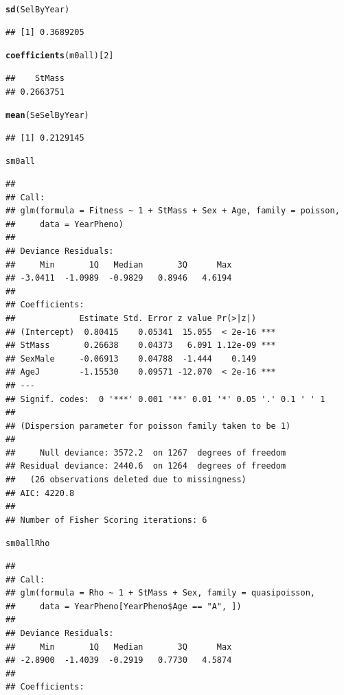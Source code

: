 \documentclass{article}\usepackage[]{graphicx}\usepackage[]{color}
\makeatletter
\newcommand{\hlnum}[1]{\textcolor[rgb]{0.686,0.059,0.569}{#1}}%
\newcommand{\hlstd}[1]{\textcolor[rgb]{0.345,0.345,0.345}{#1}}%
\newcommand{\hlkwd}[1]{\textcolor[rgb]{0.737,0.353,0.396}{\textbf{#1}}}%
\newenvironment{kframe}{%
 \def\at@end@of@kframe{}%
 \ifinner\ifhmode%
  \def\at@end@of@kframe{\end{minipage}}%
  \begin{minipage}{\columnwidth}%
 \fi\fi%
 \def\FrameCommand##1{\hskip\@totalleftmargin \hskip-\fboxsep
 \colorbox{shadecolor}{##1}\hskip-\fboxsep
     \hskip-\linewidth \hskip-\@totalleftmargin \hskip\columnwidth}%
 \MakeFramed {\advance\hsize-\width
   \@totalleftmargin\z@ \linewidth\hsize
   \@setminipage}}%
 {\par\unskip\endMakeFramed%
 \at@end@of@kframe}
\newenvironment{knitrout}{}{} %
\makeatother
\begin{document}
\begin{knitrout}
\color{fgcolor}\begin{kframe}
\begin{alltt}
\hlkwd{sd}\hlstd{(SelByYear)}
\end{alltt}
\begin{verbatim}
## [1] 0.3689205
\end{verbatim}
\begin{alltt}
\hlkwd{coefficients}\hlstd{(m0all)[}\hlnum{2}\hlstd{]}
\end{alltt}
\begin{verbatim}
##    StMass 
## 0.2663751
\end{verbatim}
\begin{alltt}
\hlkwd{mean}\hlstd{(SeSelByYear)}
\end{alltt}
\begin{verbatim}
## [1] 0.2129145
\end{verbatim}
\begin{alltt}
\hlstd{sm0all}
\end{alltt}
\begin{verbatim}
## 
## Call:
## glm(formula = Fitness ~ 1 + StMass + Sex + Age, family = poisson, 
##     data = YearPheno)
## 
## Deviance Residuals: 
##     Min       1Q   Median       3Q      Max  
## -3.0411  -1.0989  -0.9829   0.8946   4.6194  
## 
## Coefficients:
##             Estimate Std. Error z value Pr(>|z|)    
## (Intercept)  0.80415    0.05341  15.055  < 2e-16 ***
## StMass       0.26638    0.04373   6.091 1.12e-09 ***
## SexMale     -0.06913    0.04788  -1.444    0.149    
## AgeJ        -1.15530    0.09571 -12.070  < 2e-16 ***
## ---
## Signif. codes:  0 '***' 0.001 '**' 0.01 '*' 0.05 '.' 0.1 ' ' 1
## 
## (Dispersion parameter for poisson family taken to be 1)
## 
##     Null deviance: 3572.2  on 1267  degrees of freedom
## Residual deviance: 2440.6  on 1264  degrees of freedom
##   (26 observations deleted due to missingness)
## AIC: 4220.8
## 
## Number of Fisher Scoring iterations: 6
\end{verbatim}
\begin{alltt}
\hlstd{sm0allRho}
\end{alltt}
\begin{verbatim}
## 
## Call:
## glm(formula = Rho ~ 1 + StMass + Sex, family = quasipoisson, 
##     data = YearPheno[YearPheno$Age == "A", ])
## 
## Deviance Residuals: 
##     Min       1Q   Median       3Q      Max  
## -2.8900  -1.4039  -0.2919   0.7730   4.5874  
## 
## Coefficients:

\end{verbatim}
\end{kframe}
\end{knitrout}
\end{document}
